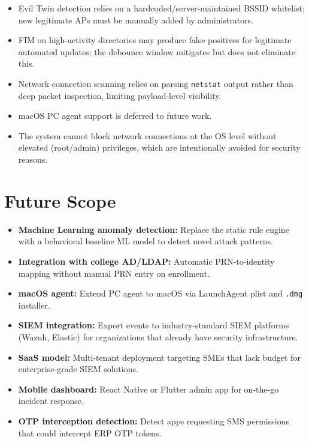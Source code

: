 \documentclass[12pt,a4paper]{report}
\begin{document}
\begin{itemize}[leftmargin=*, noitemsep]
  \item Evil Twin detection relies on a hardcoded/server-maintained BSSID whitelist; new legitimate APs must be manually added by administrators.
  \item FIM on high-activity directories may produce false positives for legitimate automated updates; the debounce window mitigates but does not eliminate this.
  \item Network connection scanning relies on parsing \texttt{netstat} output rather than deep packet inspection, limiting payload-level visibility.
  \item macOS PC agent support is deferred to future work.
  \item The system cannot block network connections at the OS level without elevated (root/admin) privileges, which are intentionally avoided for security reasons.
\end{itemize}

\section{Future Scope}

\begin{itemize}[leftmargin=*, noitemsep]
  \item \textbf{Machine Learning anomaly detection:} Replace the static rule engine with a behavioral baseline ML model to detect novel attack patterns.
  \item \textbf{Integration with college AD/LDAP:} Automatic PRN-to-identity mapping without manual PRN entry on enrollment.
  \item \textbf{macOS agent:} Extend PC agent to macOS via LaunchAgent plist and \texttt{.dmg} installer.
  \item \textbf{SIEM integration:} Export events to industry-standard SIEM platforms (Wazuh, Elastic) for organizations that already have security infrastructure.
  \item \textbf{SaaS model:} Multi-tenant deployment targeting SMEs that lack budget for enterprise-grade SIEM solutions.
  \item \textbf{Mobile dashboard:} React Native or Flutter admin app for on-the-go incident response.
  \item \textbf{OTP interception detection:} Detect apps requesting SMS permissions that could intercept ERP OTP tokens.
\end{itemize}
\end{document}
